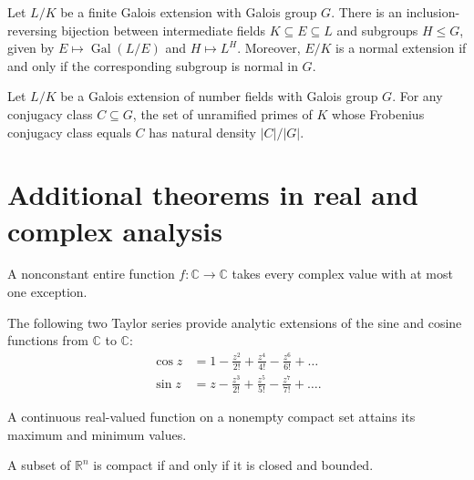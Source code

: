 \documentclass[11pt]{scrartcl}
\providecommand{\CC}{\mathbb C}
\providecommand{\RR}{\mathbb R}
\begin{document}
\begin{theorem}
  Let $L/K$ be a finite Galois extension with Galois group $G$.
  There is an inclusion-reversing bijection between
  intermediate fields $K \subseteq E \subseteq L$
  and subgroups $H \le G$,
  given by $E \mapsto \operatorname{Gal}(L/E)$ and $H \mapsto L^H$.
  Moreover, $E/K$ is a normal extension
  if and only if the corresponding subgroup is normal in $G$.
\end{theorem}

\begin{theorem}
  Let $L/K$ be a Galois extension of number fields with Galois group $G$.
  For any conjugacy class $C \subseteq G$,
  the set of unramified primes of $K$ whose Frobenius conjugacy class equals $C$
  has natural density $|C|/|G|$.
\end{theorem}

\section{Additional theorems in real and complex analysis}
\begin{theorem}
  A nonconstant entire function $f \colon \CC \to \CC$
  takes every complex value with at most one exception.
\end{theorem}

\begin{theorem}
  The following two Taylor series provide analytic extensions of the sine and cosine
  functions from $\CC$ to $\CC$:
  \begin{align*}
    \cos z &= 1 - \frac{z^2}{2!} + \frac{z^4}{4!} - \frac{z^6}{6!} + \dots \\
    \sin z &= z - \frac{z^3}{2!} + \frac{z^5}{5!} - \frac{z^7}{7!} + \dots.
  \end{align*}
\end{theorem}

\begin{theorem}
  A continuous real-valued function on a nonempty compact set
  attains its maximum and minimum values.
\end{theorem}

\begin{theorem}
  A subset of $\RR^n$ is compact
  if and only if it is closed and bounded.
\end{theorem}
\end{document}
